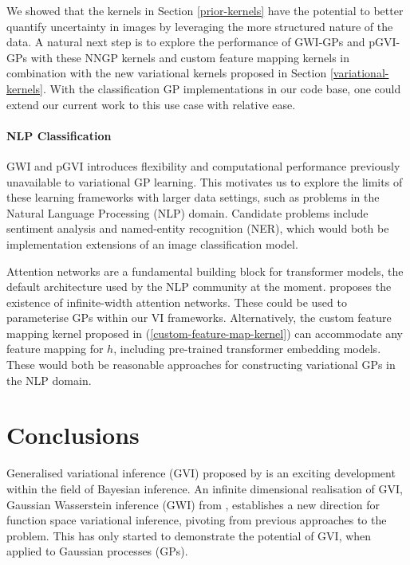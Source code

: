 \documentclass{article}
\numberwithin{equation}{section}
\begin{document}
We showed that the kernels in Section \ref{prior-kernels} have the potential to better quantify uncertainty in images by leveraging the more structured nature of the data.
A natural next step is to explore the performance of GWI-GPs and pGVI-GPs with these NNGP kernels and custom feature mapping kernels in combination with the new variational kernels proposed in Section \ref{variational-kernels}.
With the classification GP implementations in our code base, one could extend our current work to this use case with relative ease.

\paragraph{NLP Classification} GWI and pGVI introduces flexibility and computational performance previously unavailable to variational GP learning. 
This motivates us to explore the limits of these learning frameworks with larger data settings, such as problems in the Natural Language Processing (NLP) domain.
Candidate problems include sentiment analysis and named-entity recognition (NER), which would both be implementation extensions of an image classification model.

Attention networks are a fundamental building block for transformer models, the default architecture used by the NLP community at the moment. \cite{pmlr-v119-hron20a} proposes the existence of infinite-width attention networks.
These could be used to parameterise GPs within our VI frameworks.
Alternatively, the custom feature mapping kernel proposed in (\ref{custom-feature-map-kernel}) can accommodate any feature mapping for $h$, including pre-trained transformer embedding models. 
These would both be reasonable approaches for constructing variational GPs in the NLP domain.

\newpage
\section{Conclusions}\label{section:conclusions}
Generalised variational inference (GVI) proposed by \cite{knoblauch2022optimization} is an exciting development within the field of Bayesian inference.
An infinite dimensional realisation of GVI, Gaussian Wasserstein inference (GWI) from \cite{wild2022generalized}, establishes a new direction for function space variational inference, pivoting from previous approaches to the problem.
This has only started to demonstrate the potential of GVI, when applied to Gaussian processes (GPs). 
\end{document}
